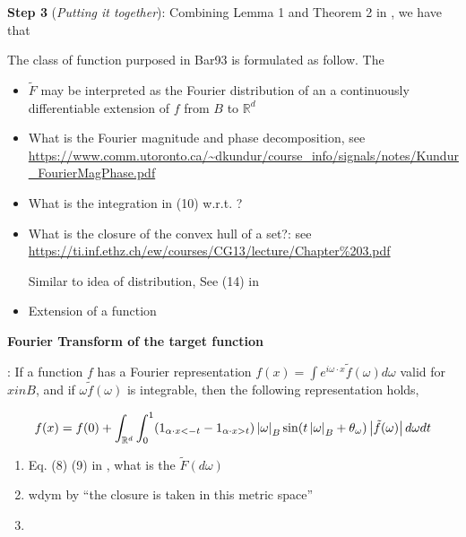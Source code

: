 \textbf{Step 3} (\textit{Putting it together}): Combining Lemma 1 and 
Theorem 2 in \cite{barron_universal_1993}, we have that

\newpage



The class of function purposed in Bar93 is formulated as follow. The    

\begin{itemize}
    \item $\tilde{F}$ may be interpreted as the Fourier distribution of an a continuously differentiable extension of $f$ from $B$ to $\mathbb{R}^d$
    \item What is the Fourier magnitude and phase decomposition, see \url{https://www.comm.utoronto.ca/~dkundur/course_info/signals/notes/Kundur_FourierMagPhase.pdf}
    \item What is the integration in (10) w.r.t. ?
    \item What is the closure of the convex hull of a set?:  see \url{https://ti.inf.ethz.ch/ew/courses/CG13/lecture/Chapter%203.pdf}
        
        \quad Similar to idea of distribution, See (14) in \cite{barron_universal_1993}
    \item Extension of a function
\end{itemize}


\textbf{Fourier Transform of the target function}

\cite[Theorem~2]{barron_neural_1992}: If a function $f$ has a Fourier representation 
$f(x) = \int e^{i\omega\cdot x} \tilde{f}(\omega) d\omega$ valid for $x in B$, and 
if $\omega \tilde{f}(\omega)$ is integrable, then the following representation
holds,

\begin{equation}
    f(x) = f(0) + \int_{\mathbb{R}^d}\int_0^1 
    (1_{\alpha \cdot x < -t} - 1_{\alpha \cdot x > t}) \left| \omega \right|_B 
    \sin(t\left| \omega \right|_B + \theta_{\omega}) \left| \tilde{f}(\omega) \right| d\omega dt
\end{equation}


\begin{enumerate}
    \item Eq. (8) (9) in \cite{barron_universal_1993}, what is the $\tilde{F}(d\omega)$  
    \item wdym by ``the closure is taken in this metric space''
    \item 
\end{enumerate}


